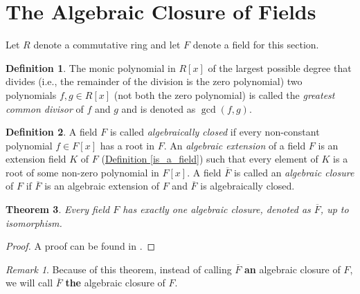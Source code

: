 \documentclass[openany, a4paper, 10pt]{book}
\theoremstyle{plain}
\newtheorem{theorem}{Theorem}[chapter]
\theoremstyle{plain}
\theoremstyle{plain}
\theoremstyle{definition}
\newtheorem{definition}[theorem]{Definition}
\theoremstyle{plain}
\theoremstyle{definition}
\theoremstyle{remark}
\newtheorem*{remark}{Remark}
\newcommand{\defref}[1]{\hyperref[#1]{Definition \ref{#1}}}
\begin{document}
\section{The Algebraic Closure of Fields}\label{sec:alg_closure}
Let $R$ denote a commutative ring and let $F$ denote a field for this section.
\begin{definition}\label{alg_polrings}
    The monic polynomial in $R[x]$ of the largest possible degree that divides (i.e., the remainder of the division is the zero polynomial) two polynomials $f,g \in R[x]$ (not both the zero polynomial) is called the \textit{greatest common divisor} of $f$ and $g$ and is denoted as $\gcd(f,g)$.
\end{definition}

\begin{definition}\label{alg_closure}
    A field $F$ is called \textit{algebraically closed} if every non-constant polynomial $f \in F[x]$ has a root in $F$.
    An \textit{algebraic extension} of a field $F$ is an extension field $K$ of $F$ (\defref{is_a_field}) such that every element of $K$ is a root of some non-zero polynomial in $F[x]$.
    A field $\overline F$ is called an \textit{algebraic closure} of $F$ if $\overline F$ is an algebraic extension of $F$ and $\overline F$ is algebraically closed.
\end{definition}
\begin{theorem}
    Every field $F$ has exactly one algebraic closure, denoted as $\overline F$, up to isomorphism.
\end{theorem}
\begin{proof}
    A proof can be found in \cite[\href{https://stacks.math.columbia.edu/tag/09GP}{Tag 09GP}]{stacks-project}.
\end{proof}
\begin{remark}
    Because of this theorem, instead of calling $\overline F$ \textbf{an} algebraic closure of $F$, we will call $\overline F$ \textbf{the} algebraic closure of $F$.
\end{remark}
\end{document}
